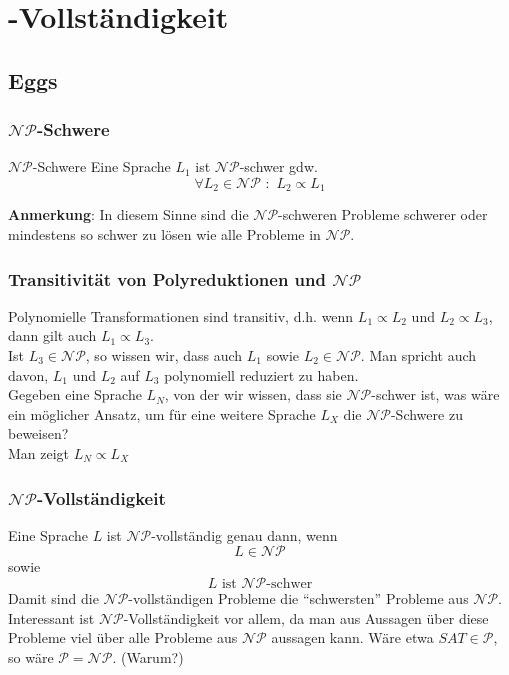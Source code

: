 \section{\classNP{}-Vollständigkeit}
\subsection{Eggs}
\begin{frame}
\frametitle{$\mathcal{NP}$-Schwere}
\begin{block}{$\mathcal{NP}$-Schwere}
Eine Sprache $L_1$ ist $\mathcal{NP}$-schwer gdw. 
\[\forall L_2 \in \mathcal{NP} \,\, : \,\, L_2 \propto L_1\]
\end{block}
\textbf{Anmerkung}: In diesem Sinne sind die $\mathcal{NP}$-schweren Probleme schwerer oder mindestens so schwer zu lösen wie alle Probleme in $\mathcal{NP}$.
\end{frame}

\begin{frame}
\frametitle{Transitivität von Polyreduktionen und $\mathcal{NP}$}
Polynomielle Transformationen sind transitiv, d.h. wenn $L_1 \propto L_2$ und $L_2 \propto L_3$, dann gilt auch $L_1 \propto L_3$.\\[8pt]
Ist $L_3 \in \mathcal{NP}$, so wissen wir, dass auch $L_1$ sowie $L_2 \in \mathcal{NP}$. Man spricht auch davon, $L_1$ und $L_2$ auf $L_3$ polynomiell reduziert zu haben.\\[8pt]
Gegeben eine Sprache $L_N$, von der wir wissen, dass sie $\mathcal{NP}$-schwer ist, was wäre ein möglicher Ansatz, um für eine weitere Sprache $L_X$ die $\mathcal{NP}$-Schwere zu beweisen?\\[8pt]
\invincible\pause
\ducttape{1.5cm}
Man zeigt $L_N \propto L_X$
\vincible
\end{frame}

\begin{frame}
\frametitle{$\mathcal{NP}$-Vollständigkeit}
Eine Sprache $L$ ist $\mathcal{NP}$-vollständig genau dann, wenn
$$L \in \mathcal{NP}$$ sowie $$L\mbox{ ist $\mathcal{NP}$-schwer}$$
Damit sind die $\mathcal{NP}$-vollständigen Probleme die "`schwersten"' Probleme aus $\mathcal{NP}$.\\
Interessant ist $\mathcal{NP}$-Vollständigkeit vor allem, da man aus Aussagen über diese Probleme viel über alle Probleme aus $\mathcal{NP}$ aussagen kann.
Wäre etwa $SAT \in \mathcal{P}$, so wäre $\mathcal{P} = \mathcal{NP}$. (Warum?)
\end{frame}

